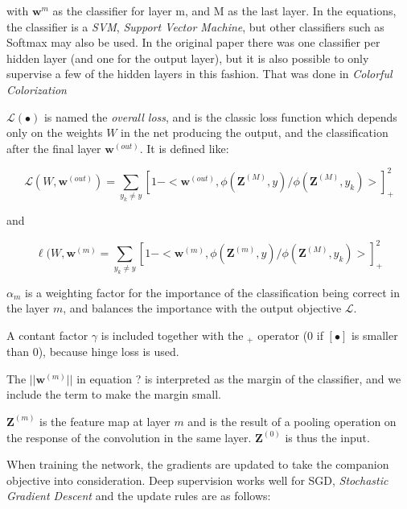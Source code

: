 with $\textbf{w}^{m}$ as the classifier for layer m, and M as the last layer. In the equations, the classifier is a \emph{SVM}, \emph{Support Vector Machine}, but other classifiers such as Softmax may also be used. In the original paper there was one classifier per hidden layer (and one for the output layer), but it is also possible to only supervise a few of the hidden layers in this fashion. That was done in \emph{Colorful Colorization} %

$\mathcal{L}(\bullet)$ is named the \emph{overall loss}, and is the classic loss function which depends only on the weights $W$ in the net producing the output, and the classification after the final layer $\textbf{w}^{(out)}$. It is defined like:

\begin{equation}
\mathcal{L}(W, \textbf{w}^{(out)}) = \sum\limits_{y_k \neq y} [1 - < \textbf{w}^{(out)}, \phi(\textbf{Z}^{(M)}, y) / \phi(\textbf{Z}^{(M)}, y_k) >]^{2}_+
\end{equation}

and

\begin{equation}\label{eq:deep_loss}
\ell(W, \textbf{w}^{(m)} = \sum\limits_{y_k \neq y} [1 - < \textbf{w}^{(m)}, \phi(\textbf{Z}^{(m)}, y) / \phi(\textbf{Z}^{(M)}, y_k) >]^{2}_+
\end{equation}

$\alpha_m$ is a weighting factor for the importance of the classification being correct in the layer $m$, and balances the importance with the output objective $\mathcal{L}$.

A contant factor $\gamma$ is included together with the $_+$ operator (0 if $[\bullet]$ is smaller than 0), because hinge loss is used. %

The $||\textbf{w}^{(m)}||$ in equation ?%
 is interpreted as the margin of the classifier, and we include the term to make the margin small. 

$\textbf{Z}^{(m)}$ is the feature map at layer $m$ and is the result of a pooling operation on the response of the convolution in the same layer. $\textbf{Z}^{(0)}$ is thus the input.

When training the network, the gradients are updated to take the companion objective into consideration. Deep supervision works well for SGD, \emph{Stochastic Gradient Descent} and the update rules are as follows:

